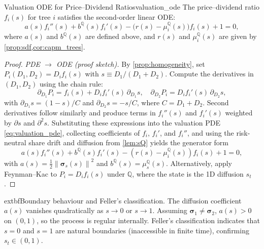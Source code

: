 ﻿\documentclass[11pt,letterpaper,oneside]{article}
\numberwithin{equation}{section}
\newcommand{\1}{\mathbf{1}}
\newcommand{\norm}[1]{\left\lVert #1\right\rVert}
\begin{document}
\begin{theorem}{Valuation ODE for Price--Dividend Ratios}{valuation_ode}
The price--dividend ratio $f_i(s)$ for tree $i$ satisfies the second-order linear ODE:
\begin{equation}\label{eq:ode_price}
  a(s) f_i''(s) + b^{\mathbb{Q}}(s) f_i'(s) - \big(r(s)-\mu_i^{\mathbb{Q}}(s)\big) f_i(s) + 1 = 0,
\end{equation}
where $a(s)$ and $b^{\mathbb{Q}}(s)$ are defined above, and $r(s)$ and $\mu_i^{\mathbb{Q}}(s)$ are given by \cref{prop:sdf,cor:capm_trees}.
\end{theorem}
\begin{proof}
\emph{PDE $\to$ ODE (proof sketch).} By \cref{prop:homogeneity}, set $P_i(D_1,D_2)=D_i f_i(s)$ with $s\equiv D_1/(D_1+D_2)$. Compute the derivatives in $(D_1,D_2)$ using the chain rule:
\[
  \partial_{D_1} P_i = f_i(s) + D_i f_i'(s)\,\partial_{D_1}s,\quad
  \partial_{D_2} P_i = D_i f_i'(s)\,\partial_{D_2}s,
\]
with $\partial_{D_1}s = (1-s)/C$ and $\partial_{D_2}s = -s/C$, where $C=D_1+D_2$. Second derivatives follow similarly and produce terms in $f_i''(s)$ and $f_i'(s)$ weighted by $\partial s$ and $\partial^2 s$. Substituting these expressions into the valuation PDE \eqref{eq:valuation_pde}, collecting coefficients of $f_i$, $f_i'$, and $f_i''$, and using the risk-neutral share drift and diffusion from \cref{lem:sQ} yields the generator form
\[
  a(s) f_i''(s) + b^{\mathbb{Q}}(s) f_i'(s) - (r(s)-\mu_i^{\mathbb{Q}}(s)) f_i(s) + 1 = 0,
\]
with $a(s)=\tfrac12\norm{\bm{\sigma}_s(s)}^2$ and $b^{\mathbb{Q}}(s)=\mu_s^{\mathbb{Q}}(s)$. Alternatively, apply Feynman--Kac to $P_i=D_i f_i(s)$ under $\mathbb{Q}$, where the state is the 1D diffusion $s_t$.
\end{proof}

\begin{tcolorbox}[mathstyle]
  	extbf{Boundary behaviour and Feller's classification.} The diffusion coefficient $a(s)$ vanishes quadratically as $s\to0$ or $s\to1$. Assuming $\bm{\sigma}_1\neq\bm{\sigma}_2$, $a(s)>0$ on $(0,1)$, so the process is regular internally. Feller's classification indicates that $s=0$ and $s=1$ are natural boundaries (inaccessible in finite time), confirming $s_t\in(0,1)$.
\end{tcolorbox}
\end{document}

